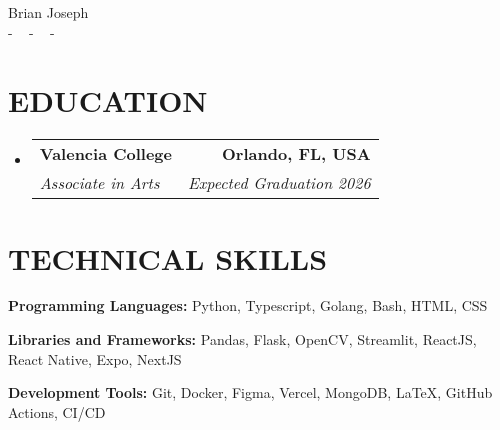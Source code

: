 \documentclass[letterpaper,11pt]{article}
\makeatletter
\newcommand{\resumeSubheading}[4]{
  \vspace{-2pt}\item
    \begin{tabular*}{1.0\textwidth}[t]{l@{\extracolsep{\fill}}r}
      \textbf{\large#1} & \textbf{\small #2} \\
      \textit{\large#3} & \textit{\small #4} \\
      
    \end{tabular*}\vspace{-7pt}
}
\newcommand{\resumeSubHeadingListStart}{\begin{itemize}[leftmargin=0.0in, label={}]}
\newcommand{\resumeSubHeadingListEnd}{\end{itemize}}
\makeatother
\begin{document}


\begin{center}
    {\huge Brian Joseph} \\ \vspace{2pt} 
    \small{-}
    \href{mailto:brianjoseph1758@gmail.com}{\color{blue}{brian@brianjoseph.me}} ~ 
    \small{-}
    \href{https://linkedin.com/in/brianjoseph1758}{ \color{blue}{linkedin.com/in/brianjoseph1758}}  ~
    \small{-}
    \href{https://github.com/lonesume}{ \color{blue}{github.com/lonesume}} ~
    \vspace{-7pt}
\end{center}

\section{\color{airforceblue}EDUCATION}
  \resumeSubHeadingListStart
    \resumeSubheading
      {Valencia College}{Orlando, FL, USA}
      {Associate in Arts}{Expected Graduation 2026}
    \vspace{-4pt}
  \resumeSubHeadingListEnd
  \vspace{-10pt}

\section{\color{airforceblue}TECHNICAL SKILLS}
 \begin{itemize}[leftmargin=0in, label={}]
    \small{\item{
     \textbf{\normalsize{Programming Languages:}}{ \normalsize{Python, Typescript, Golang, Bash, HTML, CSS}} \\
      \vspace{1.2pt}
      
     \textbf{\normalsize{Libraries and Frameworks:}}{ \normalsize{Pandas, Flask, OpenCV, Streamlit, ReactJS, React Native, Expo, NextJS }} \\
      \vspace{1.2pt}
      
     \textbf{\normalsize{Development Tools:}}{ \normalsize{Git, Docker, Figma, Vercel, MongoDB, LaTeX, GitHub Actions, CI/CD }}


     }}
 \end{itemize}
 \vspace{-16pt}
\end{document}
